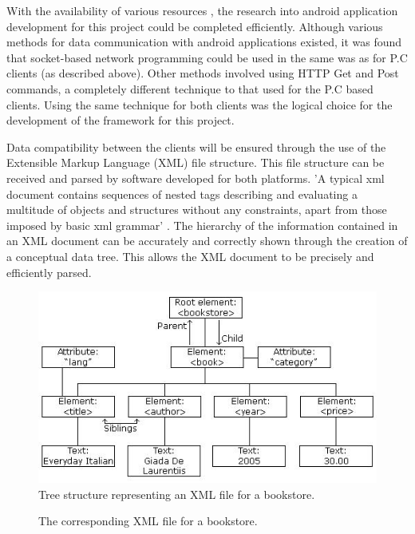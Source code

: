 \documentclass[a4paper,10pt]{report}
\begin{document}

With the availability of various resources \cite{androiddevelopers} \cite{markogargenta}, the research into android application development for this project could be completed efficiently. Although various methods for data communication with android applications existed, it was found that socket-based network programming could be used in the same was as for P.C clients (as described above). Other methods involved using HTTP Get and Post commands, a completely different technique to that used for the P.C based clients. Using the same technique for both clients was the logical choice for the development of the framework for this project.

Data compatibility between the clients will be ensured through the use of the Extensible Markup Language (XML) file structure. This file structure can be received and parsed by software developed for both platforms. 'A typical xml document contains sequences of nested tags describing and evaluating a multitude of objects and structures without any constraints, apart from those imposed by basic xml grammar' \cite{xmlbook}. The hierarchy of the information contained in an XML document can be accurately and correctly shown through the creation of a conceptual data tree. This allows the XML document to be precisely and efficiently parsed.

\begin{figure}[htb]
\centering
\includegraphics[scale=0.4]{nodetree.jpg}
\vspace{-10pt}
\caption{Tree structure representing an XML file for a bookstore.}
\vspace{-10pt}
\label{fig:exampleimg1}
\end{figure}

\begin{figure}[htb]
\centering

\vspace{-10pt}
\caption{The corresponding XML file for a bookstore.}
\label{fig:xml}
\end{figure}
\end{document}
